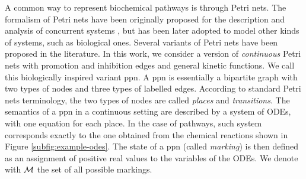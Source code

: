 

A common way to represent biochemical pathways is through Petri nets. The formalism of Petri nets have been originally proposed for the description and analysis of concurrent systems \citep{peterson1977petri}, but has been later adopted to model other kinds of systems, such as biological ones. Several variants of Petri nets have been proposed in the literature. In this work, we consider a version of \emph{continuous} Petri nets \citep{gilbert2007petri} with promotion and inhibition edges and general kinetic functions. We call this biologically inspired variant \gls{ppn}. A \gls{ppn} is essentially a bipartite graph with two types of nodes and three types of labelled edges. According to standard Petri nets terminology, the two types of nodes are called \emph{places} and \emph{transitions}. The semantics of a \gls{ppn} in a continuous setting are described by a system of ODEs, with one equation for each place. In the case of pathways, such system corresponds exactly to the one obtained from the chemical reactions shown in Figure \ref{subfig:example-odes}. The state of a \gls{ppn} (called \emph{marking}) is then defined as an assignment of positive real values to the variables of the ODEs. We denote with $\Cal{M}$ the set of all possible markings.

